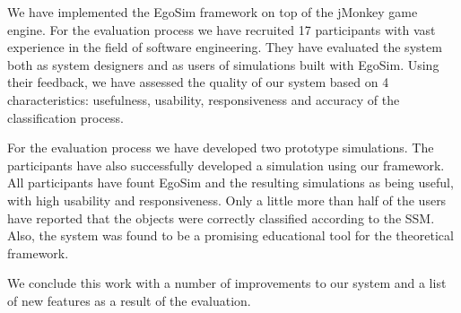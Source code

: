 We have implemented the EgoSim framework on top of the jMonkey \cite{jme:online} game engine. For the evaluation process we have recruited 17 participants with vast experience in the field of software engineering. They have evaluated the system both as system designers and as users of simulations built with EgoSim. Using their feedback, we have assessed the quality of our system based on 4 characteristics: usefulness, usability, responsiveness and accuracy of the classification process.

For the evaluation process we have developed two prototype simulations. The participants have also successfully developed a simulation using our framework. All participants have fount EgoSim and the resulting simulations as being useful, with high usability and responsiveness. Only a little more than half of the users have reported that the objects were correctly classified according to the SSM. Also, the system was found to be a promising educational tool for the theoretical framework.

We conclude this work with a number of improvements to our system and a list of new features as a result of the evaluation.

\endgroup			

\vfill